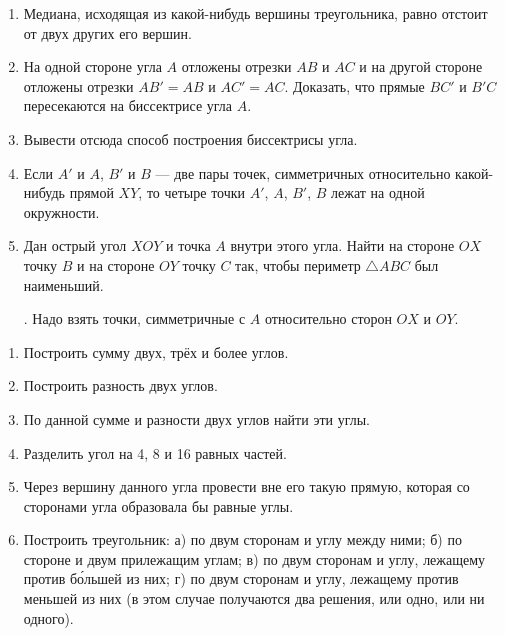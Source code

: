 {\begin{enumerate}[noitemsep]
\item %
Медиана, исходящая из какой-нибудь вершины треугольника, равно отстоит от двух других его вершин.

\item
На одной стороне угла $A$ отложены отрезки $AB$ и $AC$ и на другой стороне отложены отрезки $AB'=AB$ и $AC' = AC$.
Доказать, что прямые $BC'$ и $B'C$ пересекаются на биссектрисе угла $A$.

\item
Вывести отсюда способ построения биссектрисы угла.

\item
Если $A'$ и $A$, $B'$ и $B$ — две пары точек, симметричных относительно какой-нибудь прямой $XY$, то четыре точки $A'$, $A$, $B'$, $B$ лежат на одной окружности.

\item
Дан острый угол $XOY$ и точка $A$ внутри этого угла.
Найти на стороне $OX$ точку $B$ и на стороне $OY$ точку $C$ так, чтобы периметр $\triangle ABC$ был наименьший.

\smallskip
{}.
Надо взять точки, симметричные с $A$ относительно сторон $OX$ и $OY$.

\end{enumerate}

\begin{center}
\end{center}

\begin{enumerate}

\item
Построить сумму двух, трёх и более углов.

\item
Построить разность двух углов.

\item
По данной сумме и разности двух углов найти эти углы.

\item
Разделить угол на 4, 8 и 16 равных частей.

\item
Через вершину данного угла провести вне его такую прямую, которая со сторонами угла образовала бы равные углы.

\item
Построить треугольник:
а) по двум сторонам и углу между ними;
б) по стороне и двум прилежащим углам;
в) по двум сторонам и углу, лежащему против б\'{о}льшей из них;
г) по двум сторонам и углу, лежащему против меньшей из них (в этом случае получаются два решения, или одно, или ни одного).


\end{enumerate}}
